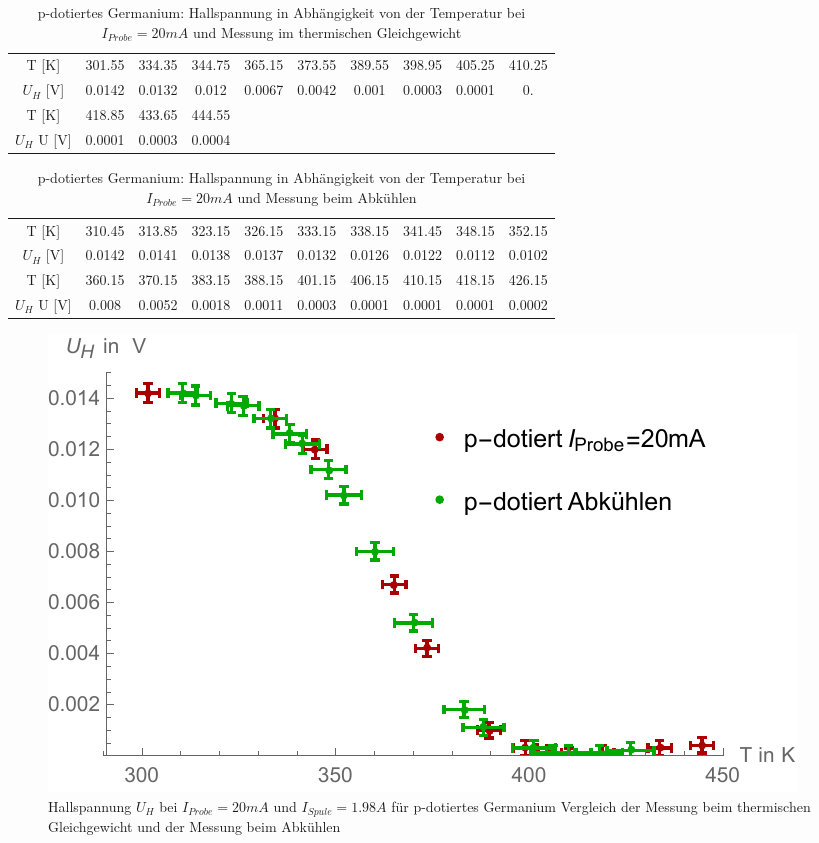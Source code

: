 \begin{table}[H]
\centering
\begin{tabular}{|c||c|c|c|c|c|c|c|c|c|}
\hline
T [K] & 301.55 & 334.35 & 344.75 & 365.15 & 373.55 & 389.55 & 398.95 & 405.25 & 410.25  \\
 $U_{H}$ [V] &0.0142 & 0.0132 & 0.012 & 0.0067 & 0.0042 & 0.001 & 0.0003 & 0.0001 & 0. \\
 \hline
 T [K] & 418.85
   & 433.65 & 444.55 &  & & & & & \\
$U_{H}$ U [V] & 0.0001 &
   0.0003 & 0.0004&  & & & & & \\
 \hline
\end{tabular}
\caption{p-dotiertes Germanium: Hallspannung in Abhängigkeit von der Temperatur bei $I_{Probe}=20mA$ und Messung im thermischen Gleichgewicht}
\end{table} 

\begin{table}[H]
\centering
\begin{tabular}{|c||c|c|c|c|c|c|c|c|c|}
\hline
T [K] & 310.45 & 313.85 & 323.15 & 326.15 & 333.15 & 338.15 & 341.45 & 348.15 & 352.15 \\
 $U_{H}$ [V] & 0.0142 & 0.0141 & 0.0138 & 0.0137 & 0.0132 & 0.0126 & 0.0122 & 0.0112 & 0.0102 \\
 \hline
 T [K] &  360.15 & 370.15 & 383.15 & 388.15 & 401.15 & 406.15 & 410.15 & 418.15 & 426.15 \\
$U_{H}$ U [V] & 0.008 & 0.0052 & 0.0018 & 0.0011 & 0.0003 & 0.0001 & 0.0001 & 0.0001 & 0.0002 \\
 \hline
\end{tabular}
\caption{p-dotiertes Germanium: Hallspannung in Abhängigkeit von der Temperatur bei $I_{Probe}=20mA$ und Messung beim Abkühlen}
\end{table}

\begin{figure}[H]
	\centering
\includegraphics[width=0.9\linewidth]{IMAGE/M33_p_GleichgewichtVsAbkuel.pdf}
	\caption{Hallspannung $U_{H}$ bei $I_{Probe}=20mA$ und $I_{Spule}=1.98A$ für p-dotiertes Germanium Vergleich der Messung beim thermischen Gleichgewicht und der Messung beim Abkühlen}
	\label{fig:M3_3_4}
\end{figure} 



